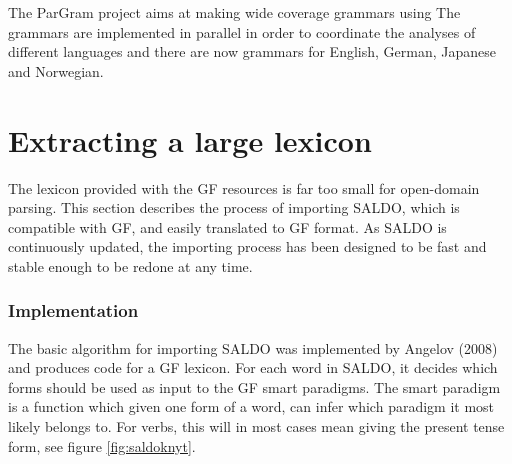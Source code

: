 \documentclass[10pt, a4paper]{article}
\begin{document}
The ParGram \cite{pargram} project aims at making wide coverage grammars using
The grammars are implemented in parallel in order to coordinate the analyses of
different languages and there are now grammars for English, German, Japanese and Norwegian. 



\section{Extracting a large lexicon}
\label{sec:extractsaldo}
The lexicon provided with the GF resources is far too small for open-domain
parsing.
This section describes the process of importing SALDO, which is 
compatible with GF, and easily translated to GF format.
As SALDO is continuously updated, the importing process has been designed to be fast
and stable enough to be redone at any time.

\subsubsection{Implementation}
The basic algorithm for importing SALDO was implemented by Angelov (2008)
and  produces code for a GF lexicon.
For each word in SALDO, it decides which forms should be used as input
to the GF smart paradigms. The smart paradigm is a function which given one
form of a word, can infer which paradigm it most likely belongs to.
For verbs, this will in most cases mean giving
the present tense form, see figure \ref{fig:saldoknyt}. \\
\end{document}
